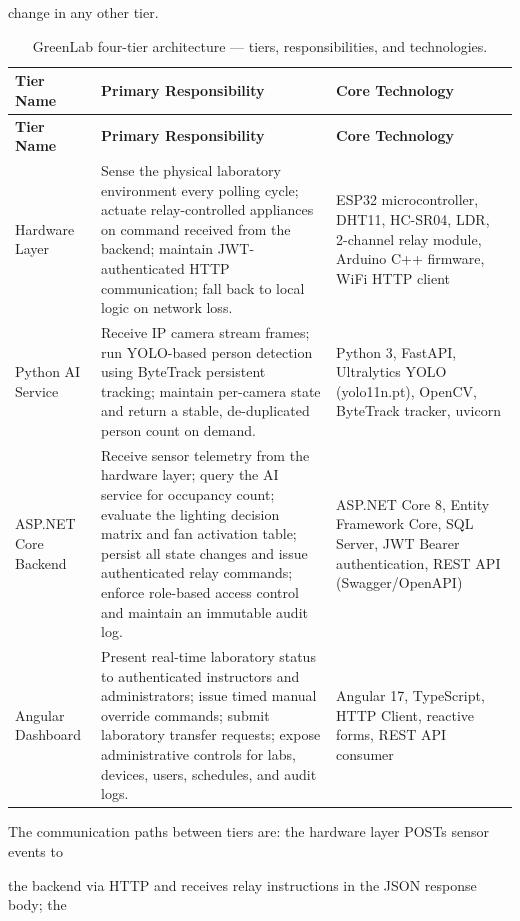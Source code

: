 change in any other tier.

\begin{longtable}{|L{2.5cm}|L{5.5cm}|L{5.0cm}|}
\caption{GreenLab four-tier architecture --- tiers, responsibilities, and technologies.} \label{tab:4-1} \\
\hline
{}
\textbf{Tier Name} & \textbf{Primary Responsibility} & \textbf{Core Technology} \\
\hline
\endfirsthead
\hline
{}
\textbf{Tier Name} & \textbf{Primary Responsibility} & \textbf{Core Technology} \\
\hline
\endhead
\hline
\endfoot
\hline
\endlastfoot
Hardware Layer & Sense the physical laboratory environment every polling cycle; actuate relay-controlled appliances on command received from the backend; maintain JWT-authenticated HTTP communication; fall back to local logic on network loss. & ESP32 microcontroller, DHT11, HC-SR04, LDR, 2-channel relay module, Arduino C++ firmware, WiFi HTTP client \\
\hline
Python AI Service & Receive IP camera stream frames; run YOLO-based person detection using ByteTrack persistent tracking; maintain per-camera state and return a stable, de-duplicated person count on demand. & Python 3, FastAPI, Ultralytics YOLO (yolo11n.pt), OpenCV, ByteTrack tracker, uvicorn \\
\hline
ASP.NET Core Backend & Receive sensor telemetry from the hardware layer; query the AI service for occupancy count; evaluate the lighting decision matrix and fan activation table; persist all state changes and issue authenticated relay commands; enforce role-based access control and maintain an immutable audit log. & ASP.NET Core 8, Entity Framework Core, SQL Server, JWT Bearer authentication, REST API (Swagger/OpenAPI) \\
\hline
Angular Dashboard & Present real-time laboratory status to authenticated instructors and administrators; issue timed manual override commands; submit laboratory transfer requests; expose administrative controls for labs, devices, users, schedules, and audit logs. & Angular 17, TypeScript, HTTP Client, reactive forms, REST API consumer \\
\hline
\end{longtable}

The communication paths between tiers are: the hardware layer POSTs sensor events to

the backend via HTTP and receives relay instructions in the JSON response body; the

